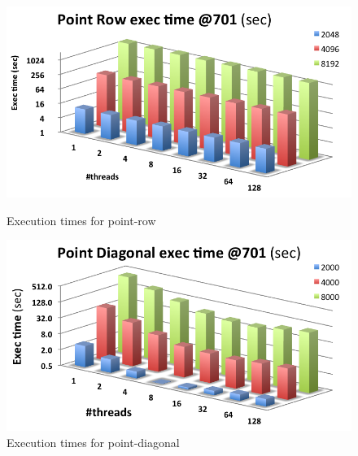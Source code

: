 \documentclass[../thesis]{subfiles}
\begin{document}
	\begin{figure}[p]
		\begin{minipage}[t]{0.48\textwidth}
			\centering
			\includegraphics[width=\textwidth]{assets/images/multicore/point-row.png}
			\captionsetup{font=small}
			\caption{Execution times for point-row}
			\label{fig:multicore:point:row:times}
		\end{minipage}
		\hfill
		\begin{minipage}[t]{0.46\textwidth}
			\centering
			\includegraphics[width=\textwidth]{assets/images/multicore/point-diagonal.png}
			\captionsetup{font=small}
			\caption{Execution times for point-diagonal}
			\label{fig:multicore:point:diagonal:speedup}
		\end{minipage}
	\end{figure}
\end{document}
